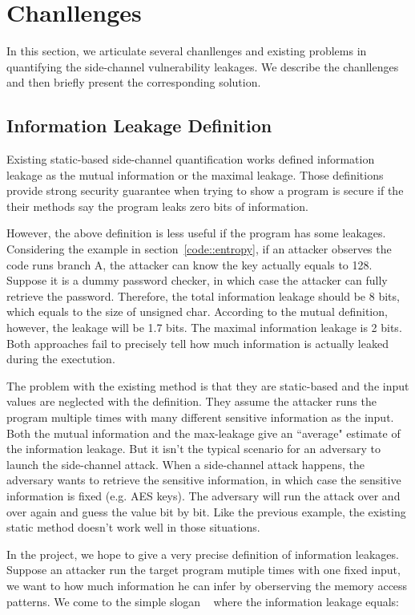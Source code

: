 \section{Chanllenges}

In this section, we articulate several chanllenges and existing problems
in quantifying the side-channel vulnerability leakages. We describe the
chanllenges and then briefly present the corresponding solution.

\subsection{Information Leakage Definition}
Existing static-based side-channel quantification works defined information leakage
as the mutual information or the maximal leakage. Those definitions provide strong security guarantee
when trying to show a program is secure if the their methods say the program leaks zero bits of
information.

However, the above definition is less useful if the program has some leakages. 
Considering the example in section~\ref{code::entropy}, if an attacker observes the
code runs branch A, the attacker can know the key actually equals to 128. Suppose it is 
a dummy password checker, in which case the attacker can fully retrieve the password.
Therefore, the total information leakage should be 8 bits, which equals to the size
of unsigned char. 
According to the mutual definition, however, the leakage will be 1.7 bits. The maximal information
leakage is 2 bits. Both approaches fail to precisely tell how much information is actually leaked
during the exectution.

The problem with the existing method is that they are static-based and the 
input values are neglected with the definition. 
They assume the attacker runs the program multiple times with many different sensitive 
information as the input. Both the mutual information and the max-leakage give an ``average" 
estimate of the information leakage. But it isn't the typical scenario for an adversary to 
launch the side-channel attack. When a side-channel attack happens, the adversary wants 
to retrieve the sensitive information, in which case the sensitive information is fixed (e.g. AES keys). 
The adversary will run the attack over and over again and guess the value bit by bit. Like the 
previous example, the existing static method doesn’t work well in those situations.

In the project, we hope to give a very precise definition of information leakages. 
Suppose an attacker run the target program mutiple times with one fixed input, we
want to how much information he can infer by oberserving the memory access patterns.
We come to the simple slogan ~\cite{10.1007/978-3-642-00596-1_21} where the information
leakage equals:


